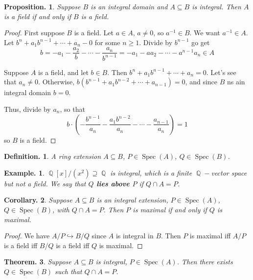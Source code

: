 \documentclass[11pt, a4paper]{memoir}
\DeclareMathOperator{\Q}{{\mathbb{Q}}}
\theoremstyle{change}
\newtheorem{theorem}{Theorem.}[section]
\newtheorem{corollary}[theorem]{Corollary.}
\newtheorem{proposition}[theorem]{Proposition.}
\theoremstyle{plain}
\theoremstyle{nonumberplain}
\newtheorem{definition}{Definition.}
\newtheorem{example}{Example.}
\newtheorem{proof}{Proof}
\DeclareMathOperator{\Spec}{Spec}
\numberwithin{equation}{section}
\begin{document}
\begin{proposition}
    Suppose $B$ is an integral domain and $A\subseteq B$ is integral.
    Then $A$ is a field if and only if $B$ is a field.
\end{proposition}
\begin{proof}
    First suppose $B$ is a field.
    Let $a\in A$, $a\neq 0$, so $a^{-1}\in B$.
    We want $a^{-1}\in A$.
    Let $b^n+a_1b^{n-1}+\cdots+a_n-0$ for some $n\geq 1$.
    Divide by $b^{n-1}$ go get
    \begin{equation*}
        b=-a_1-\frac{a_2}{b}-\cdots-\frac{a_n}{b^{n-1}}=-a_1-aa_2-\cdots-a^{n-1}a_n\in A
    \end{equation*}

    Suppose $A$ is a field, and let $b\in B$.
    Then $b^n+a_1b^{n-1}+\cdots+a_n=0$.
    Let's see that $a_n\neq 0$.
    Otherwise, $b(b^{n-1}+a_1b^{n-2}+\cdots+a_{n-1})=0$, and since $B$ ns ain integral domain $b=0$.

    Thus, divide by $a_n$, so that
    \begin{equation*}
        b\cdot\left(-\frac{b^{n-1}}{a_n}-\frac{a_1b^{n-2}}{a_n}-\cdots-\frac{a_{n-1}}{a_n}\right)=1
    \end{equation*}
    so $B$ is a field.
\end{proof}
\begin{definition}
    A ring extension $A\subseteq B$, $P\in\Spec(A)$, $Q\in\Spec(B)$.
\end{definition}
\begin{example}
    $\Q[x]/(x^2)\supseteq\Q$ is integral, which is a finite $\Q-$vector space but not a field.
    We say that \textbf{$Q$ lies above $P$} if $Q\cap A=P$.
\end{example}
\begin{corollary}
    Suppose $A\subseteq B$ is an integral extension, $P\in\Spec(A)$, $Q\in\Spec(B)$, with $Q\cap A=P$.
    Then $P$ is maximal if and only if $Q$ is maximal.
\end{corollary}
\begin{proof}
    We have $A/P\hookrightarrow B/Q$ since $A$ is integral in $B$.
    Then $P$ is maximal iff $A/P$ is a field iff $B/Q$ is a field iff $Q$ is maximal.
\end{proof}
\begin{theorem}
    Suppose $A\subseteq B$ is integral, $P\in\Spec(A)$.
    Then there exists $Q\in\Spec(B)$ such that $Q\cap A=P$.
\end{theorem}
\end{document}
